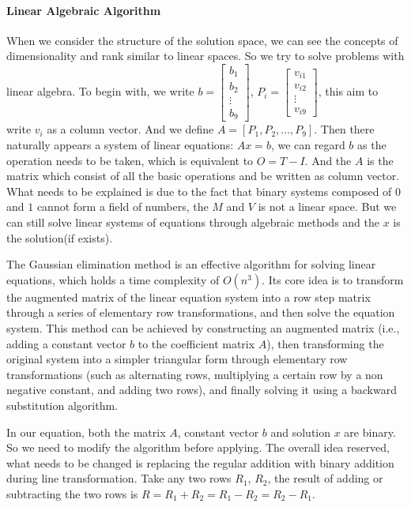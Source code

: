 \documentclass[
  manuscript=article,  %
  layout=preprint,  %
  year=20xx,
  volume=x,
]{extra/joas}
\begin{document}
\paragraph{Linear Algebraic Algorithm}
When we consider the structure of the solution space, we can see the concepts of dimensionality and rank similar to linear spaces. 
So we try to solve problems with linear algebra. To begin with, we write 
$b = \begin{bmatrix} b_1 \\ b_2 \\ \vdots \\ b_9 \end{bmatrix}$, 
$P_i = \begin{bmatrix} v_{i1} \\ v_{i2} \\ \vdots \\ v_{i9} \end{bmatrix}$, this aim to write $v_i$ as a column vector. 
And we define $A = [P_1, P_2, \dots, P_9]$. Then there naturally appears a system of linear equations: $Ax = b$, 
we can regard $b$ as the operation needs to be taken, which is equivalent to $O = T - I$. And the $A$ is the 
matrix which consist of all the basic operations and be written as column vector. What needs to be explained is 
due to the fact that binary systems composed of $0$ and $1$ cannot form a field of numbers, the $M$ and $V$ is not a linear space. 
But we can still solve linear systems of equations through algebraic methods and the $x$ is the solution(if exists). 

\par The Gaussian elimination method is an effective algorithm for solving linear equations, which holds a time complexity of $O(n^3)$. 
Its core idea is to transform the augmented matrix of the linear equation system into a row step matrix 
through a series of elementary row transformations, and then solve the equation system. 
This method can be achieved by constructing an augmented matrix (i.e., adding a constant vector $b$ to the coefficient matrix $A$), 
then transforming the original system into a simpler triangular form through elementary row transformations 
(such as alternating rows, multiplying a certain row by a non negative constant, and adding two rows), 
and finally solving it using a backward substitution algorithm.
\par In our equation, both the matrix $A$, constant vector $b$ and solution $x$ are binary. 
So we need to modify the algorithm before applying. The overall idea reserved, what needs to be changed is 
replacing the regular addition with binary addition during line transformation. Take any two rows $R_1$, $R_2$, 
the result of adding or subtracting the two rows is $R = R_1 + R_2 = R_1 - R_2 = R_2 - R_1$. 
\end{document}
